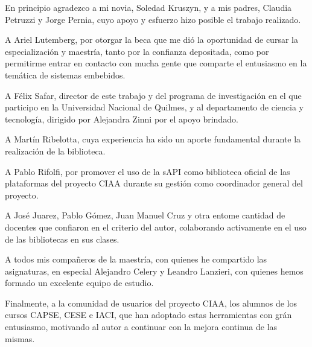 En principio agradezco a mi novia, Soledad Kruszyn, y a mis padres, Claudia Petruzzi y Jorge Pernia, cuyo apoyo y esfuerzo hizo posible el trabajo realizado.

A Ariel Lutemberg, por otorgar la beca que me dió la oportunidad de cursar la especialización y maestría, tanto por la confianza depositada, como por permitirme entrar en contacto con mucha gente que comparte el entusiasmo en la temática de sistemas embebidos.

A Félix Safar, director de este trabajo y del programa de investigación en el que participo en la Universidad Nacional de Quilmes, y al departamento de ciencia y tecnología, dirigido por Alejandra Zinni por el apoyo brindado.

A Martín Ribelotta, cuya experiencia ha sido un aporte fundamental durante la realización de la biblioteca.

A Pablo Rifolfi, por promover el uso de la sAPI como biblioteca oficial de las plataformas del proyecto CIAA durante su gestión como coordinador general del proyecto.

A José Juarez, Pablo Gómez, Juan Manuel Cruz y otra entome cantidad de docentes que confiaron en el criterio del autor, colaborando activamente en el uso de las bibliotecas en sus clases.

A todos mis compañeros de la maestría, con quienes he compartido las asignaturas, en especial Alejandro Celery y Leandro Lanzieri, con quienes hemos formado un excelente equipo de estudio.

Finalmente, a la comunidad de usuarios del proyecto CIAA, los alumnos de los cursos CAPSE, CESE e IACI, que han adoptado estas herramientas con grán entusiasmo, motivando al autor a continuar con la mejora continua de las mismas.
